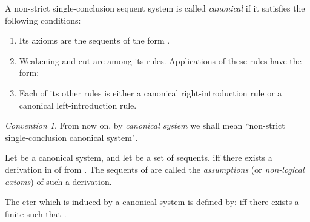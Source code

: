 \documentclass{LMCS}
\theoremstyle{remark}
\newtheorem*{convention}{Convention}
\newcommand{\be}{\begin{enumerate}[(1)]}
\newcommand{\ee}{\end{enumerate}}
\newcommand{\ed}{\end{enumerate}}
\newcommand{\bs}{\bigskip}
\begin{document}


\begin{defi}
\label{canonical system}
A non-strict single-conclusion sequent system 
is called {\em canonical} if it satisfies
the following conditions: 
\be
\item Its axioms are the sequents of the form .
\item Weakening and cut are among its rules.
Applications of these rules have the form:

\item
Each of its other rules is 
either a canonical right-introduction rule 
or a canonical left-introduction rule.
\ee
\end{defi}

\begin{convention}
From now on, by {\em canonical system} 
we shall mean ``non-strict single-conclusion canonical system".
\end{convention}

\begin{defi}
\label{syntactic tcr}
Let  be a canonical system,
and let  be a set of sequents.
 iff there exists a derivation in  of  from .
The sequents of  are called the {\em assumptions} (or {\em non-logical axioms}) of such a derivation.
\end{defi}



\begin{defi}
The etcr  
which is induced by a canonical system  is defined by:
 iff there exists a
finite  such that .
\end{defi}
\end{document}
